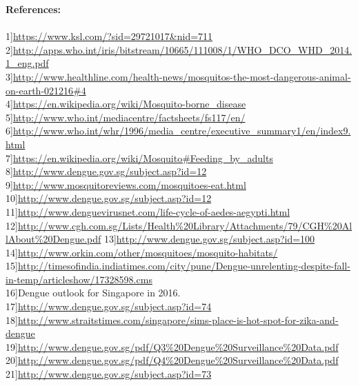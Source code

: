\documentclass[11pt]{exam}
\begin{document}
\textbf{References:} \\ \\
 1]\url{https://www.ksl.com/?sid=29721017&nid=711} \\
 2]\url{http://apps.who.int/iris/bitstream/10665/111008/1/WHO_DCO_WHD_2014.1_eng.pdf}\\
 3]\url{http://www.healthline.com/health-news/mosquitos-the-most-dangerous-animal-on-earth-021216#4} \\
 4]\url{https://en.wikipedia.org/wiki/Mosquito-borne_disease} \\
 5]\url{http://www.who.int/mediacentre/factsheets/fs117/en/}\\
 6]\url{http://www.who.int/whr/1996/media_centre/executive_summary1/en/index9.html} \\
 7]\url{https://en.wikipedia.org/wiki/Mosquito#Feeding_by_adults}\\
 8]\url{http://www.dengue.gov.sg/subject.asp?id=12} \\
 9]\url{http://www.mosquitoreviews.com/mosquitoes-eat.html}\\
 10]\url{http://www.dengue.gov.sg/subject.asp?id=12}\\
 11]\url{http://www.denguevirusnet.com/life-cycle-of-aedes-aegypti.html}\\
 12]\url{http://www.cgh.com.sg/Lists/Health\%20Library/Attachments/79/CGH\%20AllAbout\%20Dengue.pdf}
 13]\url{http://www.dengue.gov.sg/subject.asp?id=100}\\
 14]\url{http://www.orkin.com/other/mosquitoes/mosquito-habitats/}\\
 15]\url{http://timesofindia.indiatimes.com/city/pune/Dengue-unrelenting-despite-fall-in-temp/articleshow/17328598.cms}\\
 16]Dengue outlook for Singapore in 2016.\\
 17]\url{http://www.dengue.gov.sg/subject.asp?id=74}\\
 18]\url{http://www.straitstimes.com/singapore/sims-place-is-hot-spot-for-zika-and-dengue}\\
 19]\url{http://www.dengue.gov.sg/pdf/Q3\%20Dengue\%20Surveillance\%20Data.pdf}\\
 20]\url{http://www.dengue.gov.sg/pdf/Q4\%20Dengue\%20Surveillance\%20Data.pdf}\\
 21]\url{http://www.dengue.gov.sg/subject.asp?id=73}\\
\end{document}
